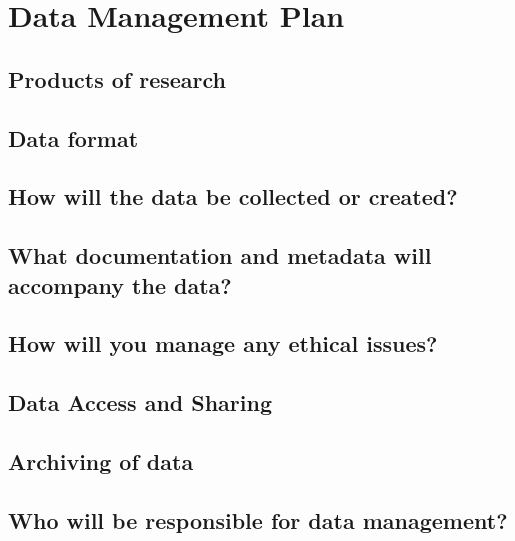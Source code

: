 \section{Data Management Plan}


\subsection{Products of research}

\lipsum[66]

\subsection{Data format}

\lipsum[66]


\subsection{How will the data be collected or created?}
\lipsum[66]


\subsection{What documentation and metadata will accompany the data?}
\lipsum[66]

\subsection{How will you manage any ethical issues?}
\lipsum[66]

\subsection{Data Access and Sharing}

\lipsum[66]





\subsection{Archiving of data}

\lipsum[66]

\subsection{Who will be responsible for data management?}

\lipsum[66]
